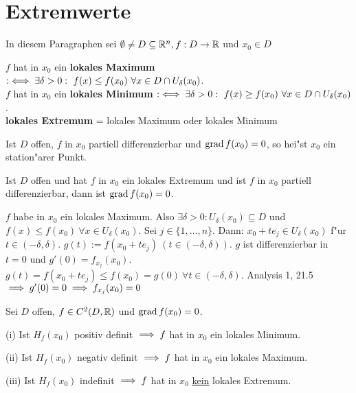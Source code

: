 \documentclass[a4paper,twoside,DIV15,BCOR12mm,chapterprefix=true,headings=twolinechapter]{scrbook}
\begin{document}
\chapter{Extremwerte}
\def\grad{\mathop{\rm grad}\nolimits}

\begin{vereinbarung}
In diesem Paragraphen sei $\emptyset\ne D \subseteq\mathbb{R}^n, f:D\to\mathbb{R}$ und $x_0\in D$
\end{vereinbarung}

\begin{definition*}
\begin{liste}
\item
$f$ hat in $x_0$ ein \textbf{lokales Maximum} $:\iff \exists \delta>0:\ f(x)\le f(x_0)\ \forall x\in D \cap U_\delta(x_0)$.\\
$f$ hat in $x_0$ ein \textbf{lokales Minimum} $:\iff \exists \delta>0:\ f(x)\ge f(x_0)\ \forall x\in D \cap U_\delta(x_0)$.\\
\textbf{lokales Extremum} = lokales Maximum oder lokales Minimum
\item Ist $D$ offen, $f$ in $x_0$ partiell differenzierbar und $\grad f(x_0)=0$, so hei"st $x_0$ ein station"arer Punkt.
\end{liste}
\end{definition*}

\begin{satz}
Ist $D$ offen und hat $f$ in $x_0$ ein lokales Extremum und ist $f$ in $x_0$ partiell differenzierbar, dann ist $\grad f(x_0)=0$.
\end{satz}

\begin{beweis}
$f$ habe in $x_0$ ein lokales Maximum. Also $\exists \delta>0: U_\delta(x_0)\subseteq D$ und $f(x)\le f(x_0)\ \forall x\in U_\delta(x_0)$. Sei $j \in \{1,\ldots,n\}$. Dann: $x_0 + te_j \in U_\delta(x_0)$ f"ur $t\in (-\delta, \delta)$. $g(t):=f(x_0 + te_j)\ (t\in (-\delta, \delta))$. $g$ ist differenzierbar in $t=0$ und $g'(0)=f_{x_j}(x_0)$. $g(t)=f(x_0+te_j)\le f(x_0)=g(0)\ \forall t\in(-\delta,\delta)$. Analysis 1, 21.5 $\implies g'(0)=0\implies f_{x_j}(x_0)=0$
\end{beweis}

\begin{satz}
Sei $D$ offen, $f\in C^2(D,\mathbb{R})$ und $\grad f(x_0)=0$.
\begin{liste}
\item[(i)]
Ist $H_f(x_0)$ positiv definit $\implies f$ hat in $x_0$ ein lokales Minimum.
\item[(ii)]
Ist $H_f(x_0)$ negativ definit $\implies f$ hat in $x_0$ ein lokales Maximum.
\item[(iii)]
Ist $H_f(x_0)$ indefinit $\implies f$ hat in $x_0$ \underline{kein} lokales Extremum.
\end{liste}
\end{satz}
\end{document}
